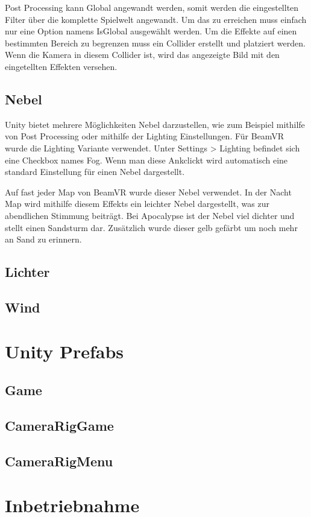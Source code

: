 Post Processing kann Global angewandt werden, somit werden die eingestellten Filter \"uber die komplette Spielwelt angewandt.
Um das zu erreichen muss einfach nur eine Option namens IsGlobal ausgew\"ahlt werden.
Um die Effekte auf einen bestimmten Bereich zu begrenzen muss ein Collider erstellt und platziert werden.
Wenn die Kamera in diesem Collider ist, wird das angezeigte Bild mit den eingetellten Effekten versehen.
~\cite{Unity_Post_Processing_Volumes_2022}


\subsection{Nebel}\label{subsec:fog-effect}
Unity bietet mehrere M\"oglichkeiten Nebel darzustellen, wie zum Beispiel mithilfe von Post Processing oder mithilfe der Lighting Einstellungen.
F\"ur BeamVR wurde die Lighting Variante verwendet.
Unter Settings > Lighting befindet sich eine Checkbox names Fog.
Wenn man diese Ankclickt wird automatisch eine standard Einstellung f\"ur einen Nebel dargestellt.
~\cite{Unity_Fog_2022}

Auf fast jeder Map von BeamVR wurde dieser Nebel verwendet.
In der Nacht Map wird mithilfe diesem Effekts ein leichter Nebel dargestellt, was zur abendlichen Stimmung beitr\"agt.
Bei Apocalypse ist der Nebel viel dichter und stellt einen Sandsturm dar. Zus\"atzlich wurde dieser gelb gef\"arbt um noch mehr an Sand zu erinnern.

\subsection{Lichter}\label{subsec:light-effect}

\subsection{Wind}\label{subsec:wind-effect}

\section{Unity Prefabs}\label{sec:prefabs}
\subsection{Game}\label{subsec:game-prefab}
\subsection{CameraRigGame}\label{subsec:camera-rig-game-prefab}
\subsection{CameraRigMenu}\label{subsec:camera-rig-menu-prefab}
\section{Inbetriebnahme}\label{sec:commissioning}
